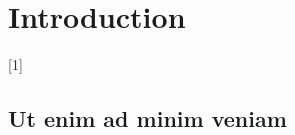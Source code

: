 \chapter*{Introduction}
\setcounter{page}{1}

\begin{chapterabstract}
	\lipsum[1]
\end{chapterabstract}

\lipsum[2][1-4]{} [1]

\lipsum[4]

\section{Ut enim ad minim veniam}

\lipsum[6-7]

